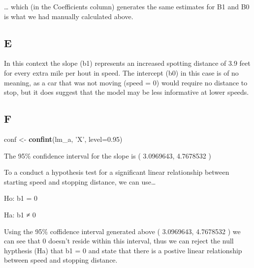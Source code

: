 \documentclass[]{article}
\newenvironment{Shaded}{\begin{snugshade}}{\end{snugshade}}
\newcommand{\DataTypeTok}[1]{\textcolor[rgb]{0.13,0.29,0.53}{#1}}
\newcommand{\FloatTok}[1]{\textcolor[rgb]{0.00,0.00,0.81}{#1}}
\newcommand{\KeywordTok}[1]{\textcolor[rgb]{0.13,0.29,0.53}{\textbf{#1}}}
\newcommand{\NormalTok}[1]{#1}
\newcommand{\StringTok}[1]{\textcolor[rgb]{0.31,0.60,0.02}{#1}}
\begin{document}
\ldots{} which (in the Coefficients column) generates the same estimates
for B1 and B0 is what we had manually calculated above.

\hypertarget{e-1}{%
\subsection{E}\label{e-1}}

In this context the slope (b1) represents an increased spotting distance
of 3.9 feet for every extra mile per hout in speed. The intercept (b0)
in this case is of no meaning, as a car that was not moving (speed = 0)
would require no distance to stop, but it does suggest that the model
may be less informative at lower speeds.

\hypertarget{f}{%
\subsection{F}\label{f}}

\begin{Shaded}
\begin{Highlighting}[]
\NormalTok{conf <-}\StringTok{ }\KeywordTok{confint}\NormalTok{(lm_a, }\StringTok{'X'}\NormalTok{, }\DataTypeTok{level=}\FloatTok{0.95}\NormalTok{)}
\end{Highlighting}
\end{Shaded}

The 95\% confidence interval for the slope is ( 3.0969643, 4.7678532 )

To a conduct a hypothesis test for a significant linear relationship
between starting speed and stopping distance, we can use\ldots{}

Ho: b1 = 0

Ha: b1 ≠ 0

Using the 95\% coffidence interval generated above ( 3.0969643,
4.7678532 ) we can see that 0 doesn't reside within this interval, thus
we can reject the null hypthesis (Ha) that b1 = 0 and state that there
is a postive linear relationship between speed and stopping distance.
\end{document}

